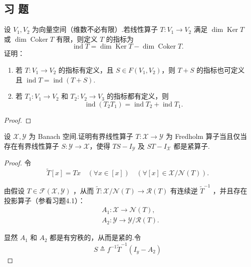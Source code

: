 \documentclass[lang=cn,newtx,10pt,scheme=chinese,thmcnt=chapter]{elegantbook}
\begin{document}
\subsection{习 题}

\begin{problemset}

  \item 设 \({V}_{1},{V}_{2}\) 为向量空间（维数不必有限）.若线性算子 \(T : {V}_{1} \rightarrow  {V}_{2}\) 满足 \(\dim \operatorname{Ker}T\) 或 \(\dim \operatorname{Coker}T\) 有限，则定义 \(T\) 的指标为
\[
  \operatorname{ind}T = \dim \operatorname{Ker}T - \dim \operatorname{Coker}T.
  \]
  证明：
  \begin{enumerate}
    \item 若 \(T : {V}_{1} \rightarrow  {V}_{2}\) 的指标有定义，且 \(S \in  F\left( {{V}_{1},{V}_{2}}\right)\)，则 \(T + S\) 的指标也可定义且 \(\operatorname{ind}T = \operatorname{ind}\left( {T + S}\right)\).
    \item 若 \({T}_{1} : {V}_{1} \rightarrow  {V}_{2}\) 和 \({T}_{2} : {V}_{2} \rightarrow  {V}_{3}\) 的指标都有定义，则
\[
    \operatorname{ind}\left( {{T}_{2}{T}_{1}}\right)  = \operatorname{ind}{T}_{2} + \operatorname{ind}{T}_{1}.
    \]
  \end{enumerate}
\begin{proof}
    
\end{proof}
  \item 设 \(\mathcal{X},\mathcal{Y}\) 为 Banach 空间.证明有界线性算子 \(T : \mathcal{X} \rightarrow  \mathcal{Y}\) 为 Fredholm 算子当且仅当存在有界线性算子 \(S : \mathcal{Y} \rightarrow  \mathcal{X}\)，使得 \({TS} - {I}_{\mathcal{Y}}\) 及 \({ST} - {I}_{\mathcal{X}}\) 都是紧算子.
\begin{proof}
  令  $$
\widetilde{T}[x]=T x \quad(\forall x \in[x]) \quad(\forall[x] \in \mathcal{X} / \mathcal{N}(T)) .
$$

由假设 $T \in \mathcal{F}(\mathcal{X}, \mathcal{Y})$ ，从而 $\widetilde{T}: \mathcal{X} / \mathcal{N}(T) \rightarrow \mathcal{R}(T)$ 有连续逆 $\widetilde{T}^{-1}$ ，并且存在投影算子（参看习题4.1）：
$$
\begin{aligned}
& A_1: \mathcal{X} \rightarrow \mathcal{N}(T), \\
& A_2: \mathcal{Y} \rightarrow \mathcal{Y} / \mathcal{R}(T) .
\end{aligned}
$$

显然 $A_1$ 和 $A_2$ 都是有穷秩的，从而是紧的.令
$$
S \triangleq f^{-1} \widetilde{T}^{-1}\left(I_y-A_2\right)
$$


\end{proof}
\end{problemset}
\end{document}
